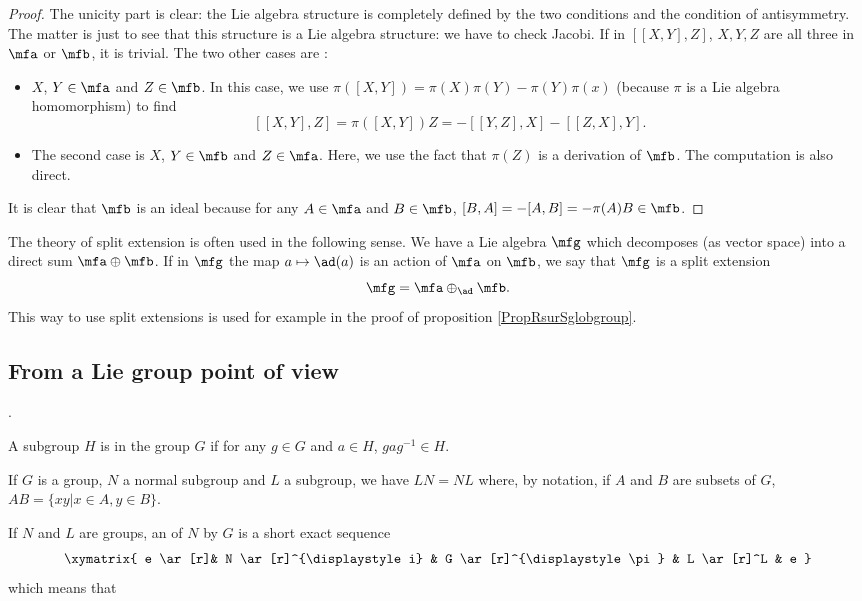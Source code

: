 \begin{proof}
    The unicity part is clear: the Lie algebra structure is completely defined by the two conditions and the condition of antisymmetry. The matter is just to see that this structure is a Lie algebra structure: we have to check Jacobi. If in $[[X,Y],Z]$, $X,Y,Z$ are all three in $\mfa$ or $\mfb$, it is trivial. The two other cases are  :
    \begin{itemize}
    \item $X$, $Y\in\mfa$ and $Z\in\mfb$. In this case, we use $\pi([X,Y])=\pi(X)\pi(Y)-\pi(Y)\pi(x)$ (because $\pi$ is a Lie algebra homomorphism) to find
    \[
    [[X,Y],Z]=\pi([X,Y])Z=-[[Y,Z],X]-[[Z,X],Y].
    \]

    \item The second case is $X$, $Y\in\mfb$ and $Z\in\mfa$. Here, we use the fact that $\pi(Z)$ is a derivation of $\mfb$. The computation is also direct.
    \end{itemize}

    It is clear that $\mfb$ is an ideal because for any $A\in\mfa$ and $B\in\mfb$, $[B,A]=-[A,B]=-\pi(A)B\in\mfb$.

\end{proof}

The theory of split extension is often used in the following sense. We have a Lie algebra $\mfg$ which decomposes (as vector space) into a direct sum $\mfa\oplus\mfb$. If in $\mfg$ the map $a\mapsto \ad(a)$ is an action of $\mfa$ on $\mfb$, we say that $\mfg$ is a split extension
\[ 
  \mfg=\mfa\oplus_{\ad}\mfb.
\]
This way to use split extensions is used for example in the proof of proposition \ref{PropRsurSglobgroup}.


\subsection{From a Lie group point of view}
.


\begin{definition}
A subgroup $H$ is  in the group $G$ if for any $g\in G$ and $a\in H$, $gag^{-1}\in H$.
\end{definition}

If $G$ is a group, $N$ a normal subgroup and $L$ a subgroup, we have $LN=NL$ where, by notation, if $A$ and $B$ are subsets of $G$, $AB=\{xy|x\in A,y\in B\}$. 

If $N$ and $L$ are groups, an  of $N$ by $G$ is a short exact sequence
\begin{equation}
\xymatrix{ e \ar[r]& N \ar[r]^{\displaystyle i} & G \ar[r]^{\displaystyle \pi} & L \ar[r]^L  & e }
\end{equation}
which means that

